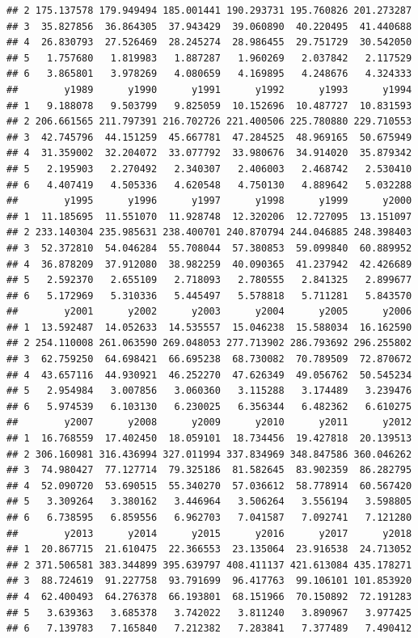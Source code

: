 \documentclass[]{book}
\begin{document}
\begin{verbatim}
## 2 175.137578 179.949494 185.001441 190.293731 195.760826 201.273287
## 3  35.827856  36.864305  37.943429  39.060890  40.220495  41.440688
## 4  26.830793  27.526469  28.245274  28.986455  29.751729  30.542050
## 5   1.757680   1.819983   1.887287   1.960269   2.037842   2.117529
## 6   3.865801   3.978269   4.080659   4.169895   4.248676   4.324333
##        y1989      y1990      y1991      y1992      y1993      y1994
## 1   9.188078   9.503799   9.825059  10.152696  10.487727  10.831593
## 2 206.661565 211.797391 216.702726 221.400506 225.780880 229.710553
## 3  42.745796  44.151259  45.667781  47.284525  48.969165  50.675949
## 4  31.359002  32.204072  33.077792  33.980676  34.914020  35.879342
## 5   2.195903   2.270492   2.340307   2.406003   2.468742   2.530410
## 6   4.407419   4.505336   4.620548   4.750130   4.889642   5.032288
##        y1995      y1996      y1997      y1998      y1999      y2000
## 1  11.185695  11.551070  11.928748  12.320206  12.727095  13.151097
## 2 233.140304 235.985631 238.400701 240.870794 244.046885 248.398403
## 3  52.372810  54.046284  55.708044  57.380853  59.099840  60.889952
## 4  36.878209  37.912080  38.982259  40.090365  41.237942  42.426689
## 5   2.592370   2.655109   2.718093   2.780555   2.841325   2.899677
## 6   5.172969   5.310336   5.445497   5.578818   5.711281   5.843570
##        y2001      y2002      y2003      y2004      y2005      y2006
## 1  13.592487  14.052633  14.535557  15.046238  15.588034  16.162590
## 2 254.110008 261.063590 269.048053 277.713902 286.793692 296.255802
## 3  62.759250  64.698421  66.695238  68.730082  70.789509  72.870672
## 4  43.657116  44.930921  46.252270  47.626349  49.056762  50.545234
## 5   2.954984   3.007856   3.060360   3.115288   3.174489   3.239476
## 6   5.974539   6.103130   6.230025   6.356344   6.482362   6.610275
##        y2007      y2008      y2009      y2010      y2011      y2012
## 1  16.768559  17.402450  18.059101  18.734456  19.427818  20.139513
## 2 306.160981 316.436994 327.011994 337.834969 348.847586 360.046262
## 3  74.980427  77.127714  79.325186  81.582645  83.902359  86.282795
## 4  52.090720  53.690515  55.340270  57.036612  58.778914  60.567420
## 5   3.309264   3.380162   3.446964   3.506264   3.556194   3.598805
## 6   6.738595   6.859556   6.962703   7.041587   7.092741   7.121280
##        y2013      y2014      y2015      y2016      y2017      y2018
## 1  20.867715  21.610475  22.366553  23.135064  23.916538  24.713052
## 2 371.506581 383.344899 395.639797 408.411137 421.613084 435.178271
## 3  88.724619  91.227758  93.791699  96.417763  99.106101 101.853920
## 4  62.400493  64.276378  66.193801  68.151966  70.150892  72.191283
## 5   3.639363   3.685378   3.742022   3.811240   3.890967   3.977425
## 6   7.139783   7.165840   7.212382   7.283841   7.377489   7.490412
\end{verbatim}
\end{document}
